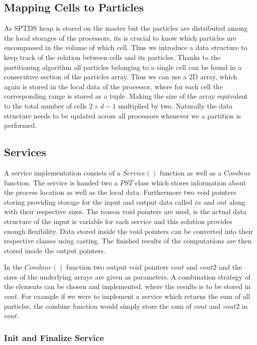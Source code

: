 \documentclass[]{article}
\begin{document}
\subsection{Mapping Cells to Particles}

As SPTDS heap is stored on the master but the particles are distributed among the local storages of the processors, its is crucial to know which particles are encompassed in the volume of which cell. Thus we introduce a data structure to keep track of the relation between cells and its particles. 
Thanks to the partitioning algorithm all particles belonging to a single cell can be found in a consecutive section of the particles array. Thus we can use a 2D array, which again is stored in the local data of the processor, where for each cell the corresponding range is stored as a tuple. Making the size of the array equivalent to the total number of cells $2 \times d -1$ multiplied by two. Naturally the data structure needs to be updated across all processors whenever we a partition is performed.

\subsection{Services}\label{services}

A service implementation consists of a $Service()$ function as well as a $Combine$ function. The service is handed two a $PST$ class which stores information about the process location as well as the local data. Furthermore two void pointers storing providing storage for the input and output data called $in$ and $out$ along with their respective sizes. The reason void pointers are used, is the actual data structure of the input is variable for each service and this solution provides enough flexibility. Data stored inside the void pointers can be converted into their respective classes using casting. The finished results of the computations are then stored inside the output pointers. 

In the $Combine()$ function two output void pointers $vout$ and $vout2$ and the sizes of the underlying arrays are given as parameters. A combination strategy of the elements can be chosen and implemented, where the results is to be stored in $vout$. For example if we were to implement a service which returns the sum of all particles, the combine function would simply store the sum of $vout$ and $vout2$ in $vout$.

\subsubsection{Init and Finalize Service}
\end{document}
